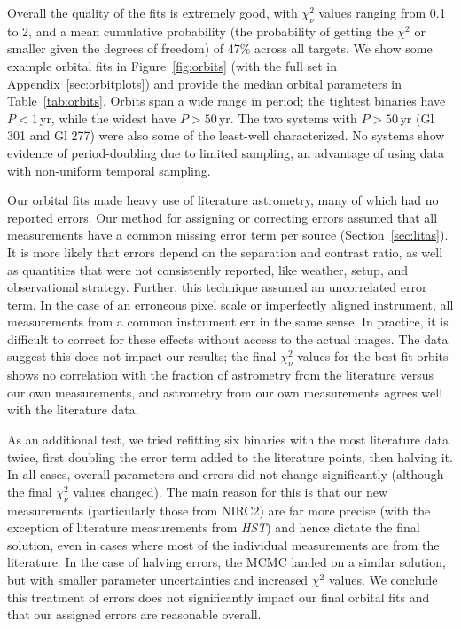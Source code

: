 \documentclass[twocolumn]{aastex62}
\begin{document}
Overall the quality of the fits is extremely good, with $\chi^2_\nu$ values ranging from 0.1 to 2, and a mean cumulative probability (the probability of getting the $\chi^2$ or smaller given the degrees of freedom) of 47\% across all targets. We show some example orbital fits in Figure~\ref{fig:orbits} (with the full set in Appendix~\ref{sec:orbitplots}) and provide the median orbital parameters in Table~\ref{tab:orbits}. Orbits span a wide range in period; the tightest binaries have $P<1$\,yr, while the widest have $P>50$\,yr. The two systems with $P>50$\,yr (Gl 301 and Gl 277) were also some of the least-well characterized. No systems show evidence of period-doubling due to limited sampling, an advantage of using data with non-uniform temporal sampling.

Our orbital fits made heavy use of literature astrometry, many of which had no reported errors. Our method for assigning or correcting errors assumed that all measurements have a common missing error term per source (Section~\ref{sec:litas}). It is more likely that errors depend on the separation and contrast ratio, as well as quantities that were not consistently reported, like weather, setup, and observational strategy. Further, this technique assumed an uncorrelated error term. In the case of an erroneous pixel scale or imperfectly aligned instrument, all measurements from a common instrument err in the same sense.   In practice, it is difficult to correct for these effects without access to the actual images. The data suggest this does not impact our results; the final $\chi^2_\nu$ values for the best-fit orbits shows no correlation with the fraction of astrometry from the literature versus our own measurements, and astrometry from our own measurements agrees well with the literature data. 

As an additional test, we tried refitting six binaries with the most literature data twice, first doubling the error term added to the literature points, then halving it. In all cases, overall parameters and errors did not change significantly (although the final $\chi^2_\nu$ values changed). The main reason for this is that our new measurements (particularly those from NIRC2) are far more precise (with the exception of literature measurements from {\it HST}) and hence dictate the final solution, even in cases where most of the individual measurements are from the literature. In the case of halving errors, the MCMC landed on a similar solution, but with smaller parameter uncertainties and increased $\chi^2$ values. We conclude this treatment of errors does not significantly impact our final orbital fits and that our assigned errors are reasonable overall.
\end{document}
